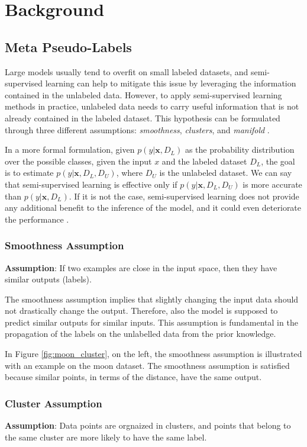 \chapter{Background}

\section{Meta Pseudo-Labels}
Large models usually tend to overfit on 
small labeled datasets, and semi-supervised learning can help to mitigate this 
issue by leveraging the information contained in the unlabeled data.
However, to apply semi-supervised learning methods in practice, unlabeled data 
needs to carry useful information that is not already contained in the labeled 
dataset. This hypothesis can be formulated through three different assumptions: 
\emph{smoothness}, \emph{clusters}, and \emph{manifold} 
\cite{chapelle2010semi}.

In a more formal formulation, given $p(y|\bm{x}, D_L)$ as the probability 
distribution over the possible classes, given the input $x$ and the labeled 
dataset $D_L$, the goal is to estimate $p(y|\bm{x}, D_L, D_U)$, where $D_U$ is the 
unlabeled dataset. We can say that semi-supervised learning is effective only if 
$p(y|\bm{x}, D_L, D_U)$ is more accurate than $p(y|\bm{x}, D_L)$. If it is not 
the case, semi-supervised learning does not provide any additional benefit to 
the inference of the model, and it could even deteriorate the performance 
\cite{chapelle2010semi}.

\subsection{Smoothness Assumption}
\textbf{Assumption}: If two examples are close in the input space, then they 
have similar outputs (labels).

The smoothness assumption implies that slightly changing the input data should 
not drastically change the output. Therefore, also the model is supposed to 
predict similar outputs for similar inputs. This assumption is fundamental in 
the propagation of the labels on the unlabelled data from the prior knowledge.

In Figure \ref{fig:moon_cluster}, on the left, the smoothness assumption is 
illustrated with an example on the moon dataset. The smoothness assumption 
is satisfied because similar points, in terms of the distance, have the same 
output.

\subsection{Cluster Assumption}
\textbf{Assumption}: Data points are orgnaized in clusters, and points that 
belong to the same cluster are more likely to have the same label.

